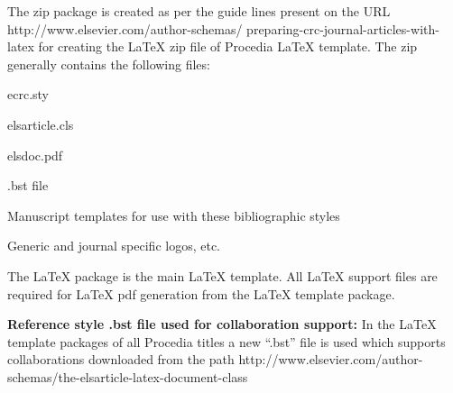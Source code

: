 \documentclass[3p,times,procedia,twocolumn,twoside]{elsarticle}
\begin{document}
The zip package is created as per the guide lines present on the URL http://www.elsevier.com/author-schemas/ preparing-crc-journal-articles-with-latex for creating the LaTeX zip file of Procedia LaTeX template.  The zip generally contains the following files:
\begin{Itemize}[]\leftskip-17.7pt
\item ecrc.sty
\item  elsarticle.cls 
\item elsdoc.pdf
\item .bst file
\item Manuscript templates for use with these bibliographic styles
\item  Generic and journal specific logos, etc.
\end{Itemize}

The LaTeX package is the main LaTeX template. All LaTeX support files are required for LaTeX pdf generation from the LaTeX template package.

{\bf Reference style .bst file used for collaboration support:} In the LaTeX template packages of all Procedia titles a new ``.bst'' file is used which supports collaborations downloaded from the path http://www.elsevier.com/author-schemas/the-elsarticle-latex-document-class
\end{document}

